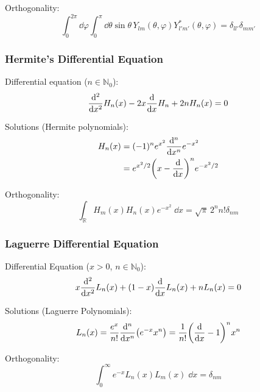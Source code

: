 			\noindent
			Orthogonality:
			\begin{equation}
				\int_0^{2\pi}\dd\varphi \int_0^{\pi}\dd\theta \sin\theta\, Y_{lm}(\theta,\varphi) Y^{*}_{l'm'}(\theta,\varphi) = 	\delta_{ll'}\delta_{mm'}
			\end{equation}

		\subsubsection{Hermite's Differential Equation}
			\noindent
			Differential equation ($n\in\mathbb{N}_0$):
			\begin{equation}
				\dv[2]{x} H_n(x) -2x\dv{x} H_n+2 n H_n(x)=0
			\end{equation}

			\noindent
			Solutions (Hermite polynomials):
			\begin{equation} \label{Eq:HermitePolynomials}
				\begin{aligned}
					H_n(x) &= (-1)^n e^{x^2} \dv[n]{x} e^{-x^2} \\
					&= e^{x^2/2}\qty(x-\dv{x})^n e^{-x^2/2} \\
				\end{aligned}
			\end{equation}

			\noindent
			Orthogonality:
			\begin{equation}
				\int_{\mathbb{R}} H_m(x) H_n(x) e^{-x^2}\;\dd x = \sqrt{\pi}\,2^n n!\delta_{nm}
			\end{equation}

		\subsubsection{Laguerre Differential Equation}
			\noindent
			Differential Equation ($x>0$, $n\in\mathbb{N}_0$):
			\begin{equation}
				x\dv[2]{x}L_n(x) +(1-x)\dv{x}L_n(x) + nL_n(x) = 0
			\end{equation}

			\noindent
			Solutions (Laguerre Polynomials):
			\begin{equation}
				L_n(x) = \frac{e^x}{n!}\dv[n]{x}(e^{-x} x^n) = \frac{1}{n!} \qty(\dv{x}-1)^n x^n
			\end{equation}

			\noindent
			Orthogonality:
			\begin{equation}
				\int_0^\infty e^{-x} L_n(x) L_m(x)\;\dd x = \delta_{nm}
			\end{equation}

